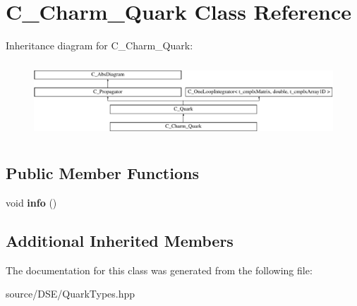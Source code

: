 \hypertarget{class_c___charm___quark}{\section{C\-\_\-\-Charm\-\_\-\-Quark Class Reference}
\label{class_c___charm___quark}
}
Inheritance diagram for C\-\_\-\-Charm\-\_\-\-Quark\-:\begin{figure}[H]
\begin{center}
\leavevmode
\includegraphics[height=2.871795cm]{class_c___charm___quark}
\end{center}
\end{figure}
\subsection*{Public Member Functions}
\begin{DoxyCompactItemize}
\item 
\hypertarget{class_c___charm___quark_acd91950b78021effccd54c0a60d8c697}{void {\bfseries info} ()}\label{class_c___charm___quark_acd91950b78021effccd54c0a60d8c697}

\end{DoxyCompactItemize}
\subsection*{Additional Inherited Members}


The documentation for this class was generated from the following file\-:\begin{DoxyCompactItemize}
\item 
source/\-D\-S\-E/Quark\-Types.\-hpp\end{DoxyCompactItemize}
